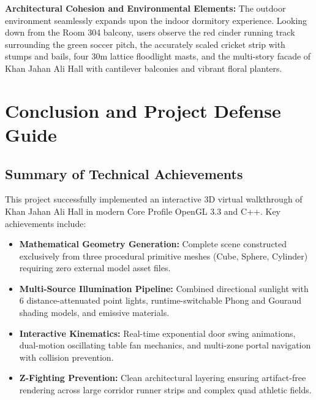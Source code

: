 \documentclass[11pt,a4paper]{article}
\begin{document}
\vspace{0.1cm}
\begin{tcolorbox}[colback=boxbg, colframe=kuetblue, arc=3pt]
\textbf{Architectural Cohesion and Environmental Elements:}
The outdoor environment seamlessly expands upon the indoor dormitory experience. Looking down from the Room 304 balcony, users observe the red cinder running track surrounding the green soccer pitch, the accurately scaled cricket strip with stumps and bails, four 30m lattice floodlight masts, and the multi-story facade of Khan Jahan Ali Hall with cantilever balconies and vibrant floral planters.
\end{tcolorbox}

\clearpage

\section{Conclusion and Project Defense Guide}

\subsection{Summary of Technical Achievements}
This project successfully implemented an interactive 3D virtual walkthrough of Khan Jahan Ali Hall in modern Core Profile OpenGL 3.3 and C++. Key achievements include:
\begin{itemize}[leftmargin=1.2em, itemsep=1.0pt]
    \item \textbf{Mathematical Geometry Generation:} Complete scene constructed exclusively from three procedural primitive meshes (Cube, Sphere, Cylinder) requiring zero external model asset files.
    \item \textbf{Multi-Source Illumination Pipeline:} Combined directional sunlight with 6 distance-attenuated point lights, runtime-switchable Phong and Gouraud shading models, and emissive materials.
    \item \textbf{Interactive Kinematics:} Real-time exponential door swing animations, dual-motion oscillating table fan mechanics, and multi-zone portal navigation with collision prevention.
    \item \textbf{Z-Fighting Prevention:} Clean architectural layering ensuring artifact-free rendering across large corridor runner strips and complex quad athletic fields.
\end{itemize}
\end{document}
